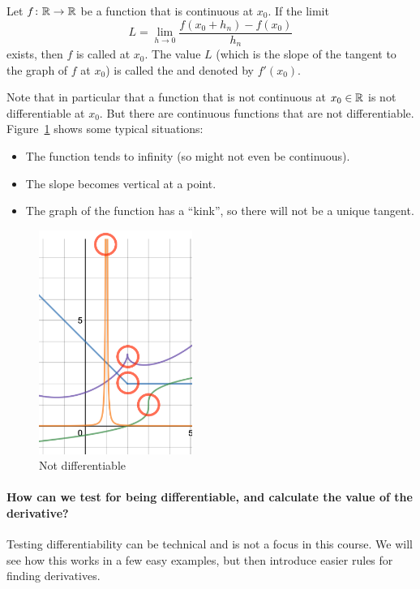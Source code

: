 \begin{defn}
Let $f\colon{\mathbb R}\to{\mathbb R}$ be a function that is continuous at $x_0$. If the limit
\[
L=\lim_{h\to 0}\frac{f(x_0+h_n)-f(x_0)}{h_n}
\]
exists, then
$f$ is called  at $x_0$. The value $L$ (which is the
slope of the tangent to the graph of $f$ at $x_0$) is called the
 and denoted by $f'(x_0)$.
\end{defn}
Note that in particular that a function that is not continuous at $x_0\in{\mathbb R}$ 
is not differentiable at $x_0$. But there are continuous functions that are
not differentiable. Figure~\ref{fiUndifferentiable} shows some typical situations:
\begin{itemize}
\item The function tends to infinity (so might not even be continuous).
\item The slope becomes vertical at a point.
\item The graph of the function has a ``kink'', so there will not be a
unique tangent.
\end{itemize}
\begin{figure}[t]
\begin{center}
\includegraphics[width=5cm]{pic/Undifferentiable.pdf}
\end{center}
\caption{Not differentiable}
\label{fiUndifferentiable}
\end{figure}

\paragraph{How can we test for being differentiable,
and calculate the value of the derivative?}
Testing differentiability can be technical and is not a focus in this
course. We will see how this works in a few easy examples, but then
introduce easier rules for finding derivatives.

